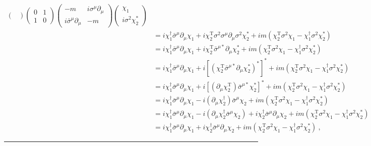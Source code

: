 \documentclass[12pt]{report}
\numberwithin{problemname}{chapter}
\newenvironment{solution}{\vspace{1em}\par\noindent{\large\textbf{\textsc{Solution}}}\par}{\vspace{1em}\hrule}
\begin{document}
\begin{solution}
\begin{enumerate}[(a)]
\begin{align}
\begin{pmatrix}
        \end{pmatrix}
        \begin{pmatrix}
          0 & 1 \\
          1 & 0
        \end{pmatrix}
        \begin{pmatrix}
          -m & i\sigma^{\mu}\partial_{\mu} \\
          i\bar{\sigma}^{\mu}\partial_{\mu} & -m
        \end{pmatrix}
        \begin{pmatrix}
          \chi_1 \\
          i\sigma^2\chi_2^*
        \end{pmatrix} \nonumber \\
        &=i\chi_1^{\dagger}\bar{\sigma}^{\mu}\partial_{\mu}\chi_1+i\chi_2^{\text{T}}\sigma^2\sigma^{\mu}\partial_{\mu}\sigma^2\chi_2^*+im(\chi_2^{\text{T}}\sigma^2\chi_1-\chi_1^{\dagger}\sigma^2\chi_2^*) \nonumber \\
        &=i\chi_1^{\dagger}\bar{\sigma}^{\mu}\partial_{\mu}\chi_1+i\chi_2^{\text{T}}\bar{\sigma}^{\mu *}\partial_{\mu}\chi_2^*+im(\chi_2^{\text{T}}\sigma^2\chi_1-\chi_1^{\dagger}\sigma^2\chi_2^*) \nonumber \\
        &=i\chi_1^{\dagger}\bar{\sigma}^{\mu}\partial_{\mu}\chi_1+i[(\chi_2^{\text{T}}\bar{\sigma}^{\mu *}\partial_{\mu}\chi_2^*)^*]^*+im(\chi_2^{\text{T}}\sigma^2\chi_1-\chi_1^{\dagger}\sigma^2\chi_2^*) \nonumber \\
        &=i\chi_1^{\dagger}\bar{\sigma}^{\mu}\partial_{\mu}\chi_1+i[(\partial_{\mu}\chi_2^{\text{T}})\bar{\sigma}^{\mu *}\chi_2^*]^*+im(\chi_2^{\text{T}}\sigma^2\chi_1-\chi_1^{\dagger}\sigma^2\chi_2^*) \nonumber \\
        &=i\chi_1^{\dagger}\bar{\sigma}^{\mu}\partial_{\mu}\chi_1-i(\partial_{\mu}\chi_2^{\dagger})\bar{\sigma}^{\mu}\chi_2+im(\chi_2^{\text{T}}\sigma^2\chi_1-\chi_1^{\dagger}\sigma^2\chi_2^*) \nonumber \\
        &=i\chi_1^{\dagger}\bar{\sigma}^{\mu}\partial_{\mu}\chi_1-i(\partial_{\mu}\chi_2^{\dagger}\bar{\sigma}^{\mu}\chi_2)+i\chi_2^{\dagger}\bar{\sigma}^{\mu}\partial_{\mu}\chi_2+im(\chi_2^{\text{T}}\sigma^2\chi_1-\chi_1^{\dagger}\sigma^2\chi_2^*) \nonumber \\
        &=i\chi_1^{\dagger}\bar{\sigma}^{\mu}\partial_{\mu}\chi_1+i\chi_2^{\dagger}\bar{\sigma}^{\mu}\partial_{\mu}\chi_2+im(\chi_2^{\text{T}}\sigma^2\chi_1-\chi_1^{\dagger}\sigma^2\chi_2^*) \ ,
    \end{align}

\end{enumerate}
\end{solution}
\end{document}
